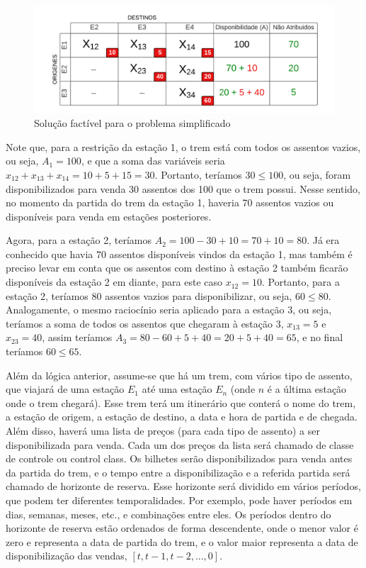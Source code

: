 \begin{figure}[H]
	\begin{center}
		\includegraphics[scale=0.4]{img/fig2.png}
		\caption{Solução factível para o problema simplificado}
		\label{fig: fig2}
	\end{center}
\end{figure}

Note que, para a restrição da estação 1, o trem está com todos os assentos vazios, ou seja, \(A_1=100\), e que a soma das variáveis seria \(x_{12} + x_{13} + x_{14} = 10 + 5 + 15 = 30\). Portanto, teríamos \(30 \leq 100\), ou seja, foram disponibilizados para venda 30 assentos dos 100 que o trem possui. Nesse sentido, no momento da partida do trem da estação 1, haveria 70 assentos vazios ou disponíveis para venda em estações posteriores.

Agora, para a estação 2, teríamos \(A_2 = 100 - 30 + 10 = 70 + 10 = 80\). Já era conhecido que havia 70 assentos disponíveis vindos da estação 1, mas também é preciso levar em conta que os assentos com destino à estação 2 também ficarão disponíveis da estação 2 em diante, para este caso \(x_{12} = 10\). Portanto, para a estação 2, teríamos 80 assentos vazios para disponibilizar, ou seja, \(60 \leq 80\). Analogamente, o mesmo raciocínio seria aplicado para a estação 3, ou seja, teríamos a soma de todos os assentos que chegaram à estação 3, \(x_{13} = 5\) e \(x_{23} = 40\), assim teríamos \(A_3 = 80 - 60 + 5 + 40 = 20 + 5 + 40 = 65\), e no final teríamos \(60 \leq 65\).

Além da lógica anterior, assume-se que há um trem, com vários tipo de assento, que viajará de uma estação $E_1$ até uma estação $E_n$ (onde $n$ é a última estação onde o trem chegará). Esse trem terá um itinerário que conterá o nome do trem, a estação de origem, a estação de destino, a data e hora de partida e de chegada. Além disso, haverá uma lista de preços (para cada tipo de assento) a ser disponibilizada para venda. Cada um dos preços da lista será chamado de classe de controle ou control class. Os bilhetes serão disponibilizados para venda antes da partida do trem, e o tempo entre a disponibilização e a referida partida será chamado de horizonte de reserva. Esse horizonte será dividido em vários períodos, que podem ter diferentes temporalidades. Por exemplo, pode haver períodos em dias, semanas, meses, etc., e combinações entre eles. Os períodos dentro do horizonte de reserva estão ordenados de forma descendente, onde o menor valor é zero e representa a data de partida do trem, e o valor maior representa a data de disponibilização das vendas, $[ t,t-1,t-2,...,0]$.

